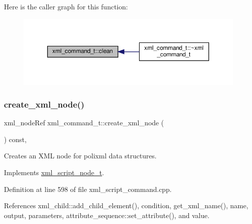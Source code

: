 Here is the caller graph for this function\+:
\nopagebreak
\begin{figure}[H]
\begin{center}
\leavevmode
\includegraphics[width=350pt]{d4/db0/classxml__command__t_ace4f9e713601beb9a850d2459550789f_icgraph}
\end{center}
\end{figure}
\mbox{\label{classxml__command__t_a8b11fb3c538442d1717e06a8f448b9ee}} 
\subsubsection{\texorpdfstring{create\+\_\+xml\+\_\+node()}{create\_xml\_node()}}
{\footnotesize\ttfamily xml\+\_\+node\+Ref xml\+\_\+command\+\_\+t\+::create\+\_\+xml\+\_\+node (\begin{DoxyParamCaption}{ }\end{DoxyParamCaption}) const\hspace{0.3cm}{\ttfamily [override]}, {\ttfamily [virtual]}}



Creates an X\+ML node for polixml data structures. 



Implements \hyperlink{classxml__script__node__t_adaf9c51a079c4617f3845c6133eb477f}{xml\+\_\+script\+\_\+node\+\_\+t}.



Definition at line 598 of file xml\+\_\+script\+\_\+command.\+cpp.



References xml\+\_\+child\+::add\+\_\+child\+\_\+element(), condition, get\+\_\+xml\+\_\+name(), name, output, parameters, attribute\+\_\+sequence\+::set\+\_\+attribute(), and value.

